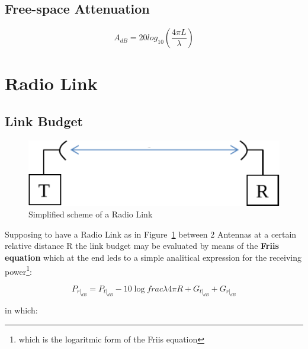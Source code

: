 \subsection{Free-space Attenuation} %
\label{sub:free_space_attenuation}

\begin{equation}
	A_{dB} = 20log_{10} \left( \frac{4 \pi L}{\lambda} \right)
\end{equation}










\section{Radio Link} %
\label{sec:radio_link}


\subsection{Link Budget} %
\label{sub:link_budget}

\begin{figure}[h]
	\centering
	\includegraphics[scale=0.6]{Immagini/link}
	
	\caption{Simplified scheme of a Radio Link}
	\label{fig:link}
\end{figure}

Supposing to have a Radio Link as in Figure~\ref{fig:link} between 2 Antennas at a certain relative distance R the link budget may be evaluated by means of the \textbf{Friis equation} which at the end leds to a simple analitical expression for the receiving power\footnote{which is the logaritmic form of the Friis equation}:

\begin{equation}	
P_{r|_{dB}} = P_{t|_{dB}} - 10 \log{frac{\lambda}{4\pi R}} + G_{t|_{dB}} + G_{r|_{dB}} 
\end{equation}

in which:


